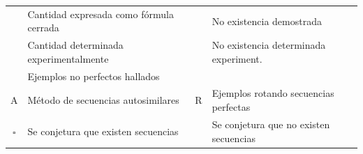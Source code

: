 \documentclass[spanish,xcolor={table}]{beamer}
\begin{document}
\begin{frame}{}
  {
    \setlength{\tabcolsep}{.3em}
    \scriptsize
    \begin{tabular}{clcl}
    \color{e-count-for}{$\blacksquare$} & Cantidad expresada como fórmula cerrada
      & \color{ne-proof}{$\blacksquare$} & No existencia demostrada \\
    \color{e-count-emp}{$\blacksquare$} & Cantidad determinada experimentalmente
      & \color{ne-empir}{$\blacksquare$} & No existencia determinada experiment. \\
    \color{e-examples}{$\blacksquare$}  & Ejemplos no perfectos hallados \\
    A & Método de secuencias autosimilares
      & R & Ejemplos rotando secuencias perfectas \\
    $\square$  & Se conjetura que existen secuencias
      & \color{ne-conjc}{$\blacksquare$}  & Se conjetura que no existen secuencias \\
    \end{tabular}
  }
\end{frame}

\end{document}
